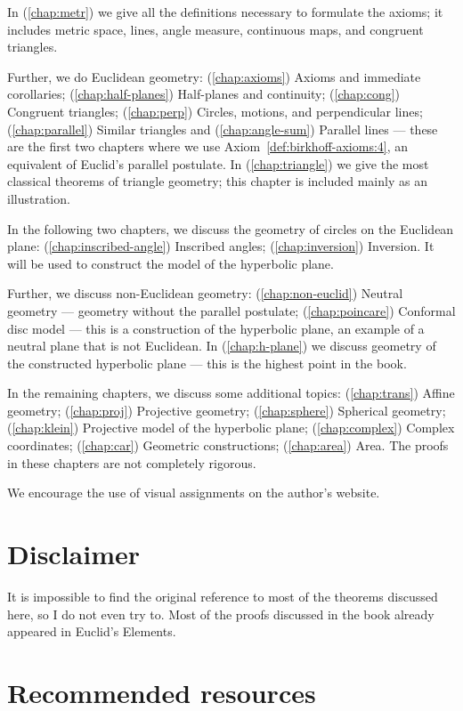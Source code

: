 In (\ref{chap:metr}) we give all the definitions necessary to formulate the axioms;
it includes metric space, 
lines, 
angle measure, 
continuous maps,
and congruent triangles.

Further, we do Euclidean geometry:
(\ref{chap:axioms}) Axioms and immediate corollaries;
(\ref{chap:half-planes}) Half-planes and continuity;
(\ref{chap:cong}) Congruent triangles;
(\ref{chap:perp}) Circles, motions, and perpendicular lines;
(\ref{chap:parallel}) Similar triangles and (\ref{chap:angle-sum}) Parallel lines  
--- these are the first two chapters where we use Axiom~\ref{def:birkhoff-axioms:4}, an equivalent of Euclid's parallel postulate.
In (\ref{chap:triangle}) we give the most classical theorems of triangle geometry;
this chapter is included mainly as an illustration.

In the following two chapters, we discuss the geometry of circles on the Euclidean plane:
(\ref{chap:inscribed-angle}) Inscribed angles; (\ref{chap:inversion}) Inversion.
It  will be used to construct the model of the hyperbolic plane.

Further, we discuss non-Euclidean geometry:
(\ref{chap:non-euclid})
Neutral geometry --- geometry without the parallel postulate;
(\ref{chap:poincare})
Conformal disc model ---
this is a construction of the hyperbolic plane,
an example of a neutral plane that is not Euclidean.
In (\ref{chap:h-plane}) we discuss geometry of the constructed hyperbolic plane --- this is the highest point in the book.

In the remaining chapters, we discuss some additional topics:
(\ref{chap:trans}) Affine geometry;
(\ref{chap:proj}) Projective geometry;
(\ref{chap:sphere}) Spherical geometry;
(\ref{chap:klein}) Projective model of the hyperbolic plane;
(\ref{chap:complex}) Complex coordinates;
(\ref{chap:car}) Geometric constructions;
(\ref{chap:area}) Area.
The proofs in these chapters are not completely rigorous.

We encourage the use of visual assignments on the author's website.

\section{Disclaimer}

It is  impossible to find the original reference to most of the theorems discussed here, so I do not even try to.
Most of the proofs discussed in the book 
already appeared in Euclid's Elements.

\section{Recommended resources}

